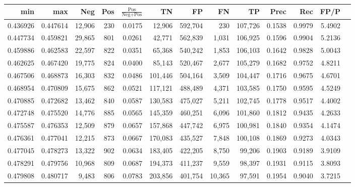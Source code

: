 \begin{tabular}{rrrrrrrrrrrrr}
\toprule
     min &      max &    Neg &   Pos & $\frac{\text{Pos}}{\text{Neg}+\text{Pos}}$ &      TN &      FP &      FN &      TP &   Prec &    Rec &   FP/P \\
\midrule
0.436926 & 0.447614 & 12,906 &   230 &                                     0.0175 &  12,906 & 592,704 &     230 & 107,726 & 0.1538 & 0.9979 & 5.4902 \\
0.447734 & 0.459821 & 29,865 &   801 &                                     0.0261 &  42,771 & 562,839 &   1,031 & 106,925 & 0.1596 & 0.9904 & 5.2136 \\
0.459886 & 0.462583 & 22,597 &   822 &                                     0.0351 &  65,368 & 540,242 &   1,853 & 106,103 & 0.1642 & 0.9828 & 5.0043 \\
0.462625 & 0.467420 & 19,775 &   824 &                                     0.0400 &  85,143 & 520,467 &   2,677 & 105,279 & 0.1682 & 0.9752 & 4.8211 \\
0.467506 & 0.468873 & 16,303 &   832 &                                     0.0486 & 101,446 & 504,164 &   3,509 & 104,447 & 0.1716 & 0.9675 & 4.6701 \\
0.468954 & 0.470809 & 15,675 &   862 &                                     0.0521 & 117,121 & 488,489 &   4,371 & 103,585 & 0.1750 & 0.9595 & 4.5249 \\
0.470885 & 0.472682 & 13,462 &   840 &                                     0.0587 & 130,583 & 475,027 &   5,211 & 102,745 & 0.1778 & 0.9517 & 4.4002 \\
0.472748 & 0.475520 & 14,776 &   885 &                                     0.0565 & 145,359 & 460,251 &   6,096 & 101,860 & 0.1812 & 0.9435 & 4.2633 \\
0.475587 & 0.476353 & 12,509 &   879 &                                     0.0657 & 157,868 & 447,742 &   6,975 & 100,981 & 0.1840 & 0.9354 & 4.1474 \\
0.476361 & 0.477041 & 12,215 &   873 &                                     0.0667 & 170,083 & 435,527 &   7,848 & 100,108 & 0.1869 & 0.9273 & 4.0343 \\
0.477045 & 0.478273 & 13,322 &   902 &                                     0.0634 & 183,405 & 422,205 &   8,750 &  99,206 & 0.1903 & 0.9189 & 3.9109 \\
0.478291 & 0.479756 & 10,968 &   809 &                                     0.0687 & 194,373 & 411,237 &   9,559 &  98,397 & 0.1931 & 0.9115 & 3.8093 \\
0.479808 & 0.480717 &  9,483 &   806 &                                     0.0783 & 203,856 & 401,754 &  10,365 &  97,591 & 0.1954 & 0.9040 & 3.7215 \\

\end{tabular}
